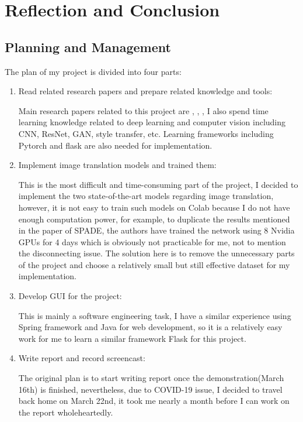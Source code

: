 \chapter{Reflection and Conclusion}
\section{Planning and Management}
The plan of my project is divided into four parts:
\begin{enumerate}
    \item Read related research papers and prepare related knowledge and tools:
    
    Main research papers related to this project are \cite{pix2pix2016}, \cite{wang2018pix2pixHD},
    \cite{park2019SPADE}, I also spend time learning knowledge related to deep 
    learning and computer vision including CNN, ResNet, GAN, style transfer, etc. 
    Learning frameworks including Pytorch and flask are also needed for implementation.
    \item Implement image translation models and trained them:
    
    This is the most difficult and time-consuming part of the project, I decided to implement 
    the two state-of-the-art models regarding image translation, however, it is not easy to 
    train such models on Colab because I do not have enough computation power, for example, 
    to duplicate the results mentioned in the paper of SPADE, the authors have trained the 
    network using 8 Nvidia GPUs for 4 days which is obviously not practicable for me, not to 
    mention the disconnecting issue. The solution here is to remove the unnecessary parts of 
    the project and choose a relatively small but still effective dataset for my implementation.
    \item Develop GUI for the project: 
    
    This is mainly a software engineering task, I have a similar experience using Spring framework 
    and Java for web development, so it is a relatively easy work for me to learn a similar 
    framework Flask for this project.
    \item Write report and record screencast: 
    
    The original plan is to start writing report once the demonstration(March 16th) is finished, 
    nevertheless, due to COVID-19 issue, I decided to travel back home on March 22nd, it took me 
    nearly a month before I can work on the report wholeheartedly.
\end{enumerate}


